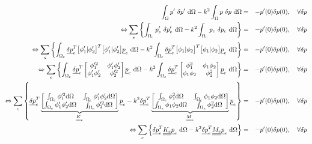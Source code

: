 \begin{eqnarray}
    \int_\Omega p'~\delta p'~\mathrm{d}\Omega - k^2\int_\Omega p~\delta p~\mathrm{d}\Omega & = & -p'(0)\delta p(0), \quad \forall\delta p\notag\\
    \Leftrightarrow \sum_e \left\{\int_{\Omega_e} p_e'~\delta p_e'~\mathrm{d}\Omega
        - k^2\int_{\Omega_e} p_e~\delta p_e~\mathrm{d}\Omega \right\}
        & = & -p'(0)\delta p(0), \quad \forall\delta p \notag\\
    \Leftrightarrow \sum_e \left\{\int_{\Omega_e}
        \underline{\delta p}_e^T\big[\phi_1'|\phi_2'\big]^T\big[\phi_1'|\phi_2'\big]\underline{p}_e~\mathrm{d}\Omega
        - k^2\int_{\Omega_e}
        \underline{\delta p}_e^T\big[\phi_1|\phi_2\big]^T\big[\phi_1|\phi_2\big]\underline{p}_e~\mathrm{d}\Omega \right\}
        & = & -p'(0)\delta p(0), \quad \forall\delta p\notag\\
    \Leftrightarrow \sum_e \left\{\int_{\Omega_e}
    \underline{\delta p}_e^T\begin{bmatrix}\phi_1'^2 & \phi_1'\phi_2'\\\phi_1'\phi_2'& \phi_2'^2\end{bmatrix}\underline{p}_e~\mathrm{d}\Omega
        - k^2\int_{\Omega_e}
\underline{\delta p}_e^T\begin{bmatrix}\phi_1^2 & \phi_1\phi_2\\\phi_1\phi_2 & \phi_2^2\end{bmatrix}\underline{p}_e~\mathrm{d}\Omega \right\}
        & = & -p'(0)\delta p(0), \quad \forall\delta p\notag\\
    \Leftrightarrow \sum_e \left\{
	\underline{\delta p}_e^T\underbrace{\begin{bmatrix}\int_{\Omega_e}\phi_1'^2\mathrm{d}\Omega & \int_{\Omega_e}\phi_1'\phi_2'\mathrm{d}\Omega\\\int_{\Omega_e}\phi_1'\phi_2'\mathrm{d}\Omega& \int_{\Omega_e}\phi_2'^2\mathrm{d}\Omega\end{bmatrix}}_{\underline{\underline{K}}_e}\underline{p}_e
        - k^2
\underline{\delta p}_e^T\underbrace{\begin{bmatrix}\int_{\Omega_e}\phi_1^2\mathrm{d}\Omega &
\int_{\Omega_e}\phi_1\phi_2\mathrm{d}\Omega\\\int_{\Omega_e}\phi_1\phi_2\mathrm{d}\Omega & \int_{\Omega_e}\phi_2^2\mathrm{d}\Omega\end{bmatrix}}_{\underline{\underline{M}}_e}\underline{p}_e \right\}
        & = & -p'(0)\delta p(0), \quad \forall\delta p\notag\\
    \Leftrightarrow \sum_e \left\{
        \underline{\delta p}_e^T\underline{\underline{K_e}}\underline{p}_e~\mathrm{d}\Omega - k^2\underline{\delta p}_e^T\underline{\underline{M_e}}\underline{p}_e~\mathrm{d}\Omega \right\}
        & = & -p'(0)\delta p(0), \quad \forall\delta p\notag\\\label{FEM1D:elem_mat}
\end{eqnarray}

